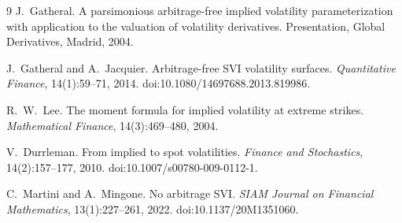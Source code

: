 \documentclass[11pt]{article}
\begin{document}


\begin{thebibliography}{9}
J.~Gatheral.
\newblock A parsimonious arbitrage-free implied volatility parameterization
with application to the valuation of volatility derivatives.
\newblock Presentation, Global Derivatives, Madrid, 2004.

J.~Gatheral and A.~Jacquier.
\newblock Arbitrage-free SVI volatility surfaces.
\newblock \emph{Quantitative Finance}, 14(1):59--71, 2014.
\newblock doi:10.1080/14697688.2013.819986.

R.~W.~Lee.
\newblock The moment formula for implied volatility at extreme strikes.
\newblock \emph{Mathematical Finance}, 14(3):469--480, 2004.

V.~Durrleman.
\newblock From implied to spot volatilities.
\newblock \emph{Finance and Stochastics}, 14(2):157--177, 2010.
\newblock doi:10.1007/s00780-009-0112-1.

C.~Martini and A.~Mingone.
\newblock No arbitrage SVI.
\newblock \emph{SIAM Journal on Financial Mathematics}, 13(1):227--261, 2022.
\newblock doi:10.1137/20M1351060.
\end{thebibliography}
\end{document}
